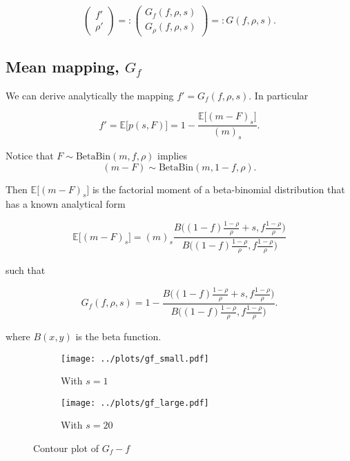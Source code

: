 \documentclass[american, abstract=on]{scrartcl}
\theoremstyle{plain}
\newcommand{\E}{\mathbb{E}}
\newcommand{\Beta}{\text{Beta}}
\newcommand{\Bin}{\text{Bin}}
\begin{document}
\begin{equation}
    \begin{pmatrix}
        f' \\ \rho'
    \end{pmatrix} =: \begin{pmatrix}
        G_f(f, \rho, s) \\ G_\rho(f, \rho, s)
    \end{pmatrix} =: G(f, \rho, s).
\end{equation}

\subsection[Mean mapping]{Mean mapping, $G_f$}

We can derive analytically the mapping $f' = G_f(f, \rho, s)$. In particular

\begin{equation}
    f' = \E\big[p(s, F)\big] = 1 - \frac{\E\big[(m - F)_s\big]}{(m)_s}.
\end{equation}

Notice that $F \sim \Beta\Bin(m, f, \rho)$ implies \begin{equation}(m - F) \sim \Beta\Bin(m, 1 - f, \rho).\end{equation}

Then $\E\big[(m - F)_s\big]$ is the factorial moment of a beta-binomial distribution that has a known analytical form

\begin{equation}
    \E\big[(m - F)_s\big] = (m)_s \frac{B\Big( (1 - f) \frac{1 - \rho}{\rho} + s, f \frac{1 - \rho}{\rho} \Big)}{B\Big( (1 - f) \frac{1 - \rho}{\rho}, f \frac{1 - \rho}{\rho} \Big)}
\end{equation}

such that

\begin{equation}
    G_f(f, \rho, s) = 1 - \frac{B\Big( (1 - f) \frac{1 - \rho}{\rho} + s, f \frac{1 - \rho}{\rho} \Big)}{B\Big( (1 - f) \frac{1 - \rho}{\rho}, f \frac{1 - \rho}{\rho} \Big)}.
\end{equation}

where $B(x, y)$ is the beta function.

\begin{figure}[H]
    \centering
    \begin{subfigure}{.5\textwidth}
        \centering
        \texttt{[image: ../plots/gf\_small.pdf]} 
        \caption{With $s = 1$}
        \label{fig:gf:small}  
    \end{subfigure}%
    \begin{subfigure}{.5\textwidth}
        \centering
        \texttt{[image: ../plots/gf\_large.pdf]}       
        \caption{With $s = 20$}
        \label{fig:gf:large}
    \end{subfigure}
    \caption{Contour plot of $G_f - f$}
    \label{fig:gf}
\end{figure}
\end{document}
